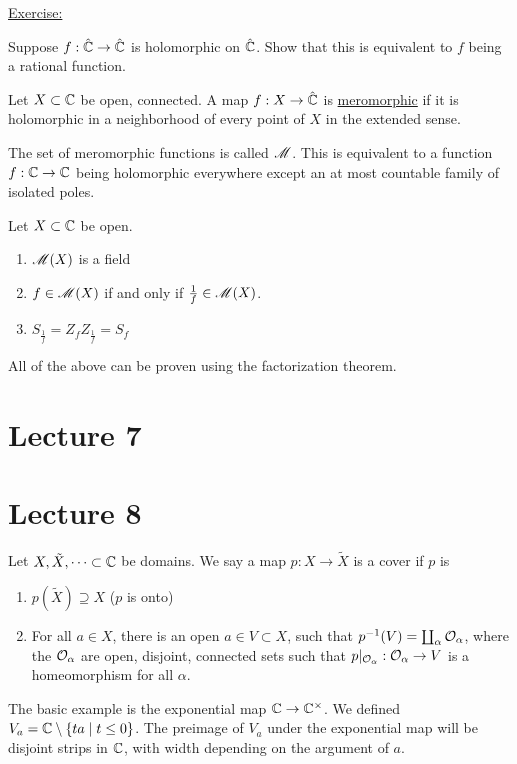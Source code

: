 \documentclass[x11names,reqno,14pt]{extarticle}
\begin{document}
\underline{Exercise:}

Suppose $f:\hat{\mathbb{C}}\to\hat{\mathbb{C}}$ is holomorphic on $\hat{\mathbb{C}}$. Show that this is equivalent to $f$ being a rational function. 


Let $X \subset \mathbb{C}$ be open, connected. A map $f:X\to\hat{\mathbb{C}}$ is \underline{meromorphic} if it is holomorphic in a neighborhood of every point of $X$ in the extended sense.   

The set of meromorphic functions is called $\mathscr{M}$. This is equivalent to a function $f:\mathbb{C}\to\mathbb{C}$ being holomorphic everywhere except an at most countable family of isolated poles. 

\prop

Let $X \subset \mathbb{C}$ be open. 
\begin{enumerate}[label=(\roman*)]
\item $\mathscr{M}(X)$ is a field
\item $f \in \mathscr{M}(X)$ if and only if $\frac{1}{f} \in \mathscr{M}(X)$. 
\item $S_{\frac{1}{f}} = Z_fZ_{\frac{1}{f}} = S_f$
\end{enumerate}

All of the above can be proven using the factorization theorem. 

\section*{Lecture 7}

\section*{Lecture 8}

Let $X, \tilde{X}, \dots \subset \mathbb{C}$ be domains. We say a map $p:X\to\tilde{X}$ is a cover if $p$ is
\begin{enumerate}
\item $p(\tilde{X}) \supseteq X$ ($p$ is onto)
\item For all $a \in X$, there is an open $a \in V \subset X$, such that $p^{-1}(V) = \coprod_{\alpha}\mathcal{O}_\alpha$, where the $\mathcal{O}_\alpha$ are open, disjoint, connected sets such that $p|_{\mathcal{O}_\alpha}:\mathcal{O}_\alpha \to V$ is a homeomorphism for all $\alpha$. 
\end{enumerate}

\exm

The basic example is the exponential map $\mathbb{C}\to\mathbb{C}^\times$. We defined $V_a = \mathbb{C}\setminus\{ta \mid t\leq 0 \}$. The preimage of $V_a$ under the exponential map will be disjoint strips in $\mathbb{C}$, with width depending on the argument of $a$. 
\end{document}
